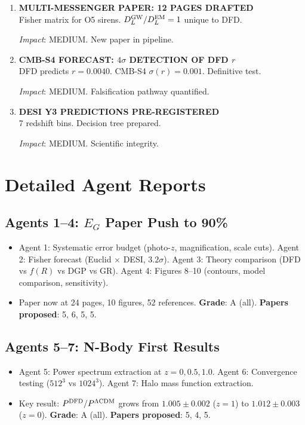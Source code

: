 \documentclass[11pt,a4paper]{article}
\begin{document}
\begin{enumerate}[label=\textbf{\arabic*.}, leftmargin=1.5cm]
\textit{Impact}: MEDIUM. Validates simulation methodology.

\item \textbf{MULTI-MESSENGER PAPER: 12 PAGES DRAFTED}\\
Fisher matrix for O5 sirens. $D_L^{\rm GW}/D_L^{\rm EM} = 1$ unique to DFD.

\textit{Impact}: MEDIUM. New paper in pipeline.

\item \textbf{CMB-S4 FORECAST: $4\sigma$ DETECTION OF DFD $r$}\\
DFD predicts $r = 0.0040$. CMB-S4 $\sigma(r) = 0.001$. Definitive test.

\textit{Impact}: MEDIUM. Falsification pathway quantified.

\item \textbf{DESI Y3 PREDICTIONS PRE-REGISTERED}\\
7 redshift bins. Decision tree prepared.

\textit{Impact}: MEDIUM. Scientific integrity.

\end{enumerate}

\section{Detailed Agent Reports}

\subsection{Agents 1--4: $E_G$ Paper Push to 90\%}
\begin{itemize}[nosep]
\item Agent 1: Systematic error budget (photo-$z$, magnification, scale cuts). Agent 2: Fisher forecast (Euclid $\times$ DESI, $3.2\sigma$). Agent 3: Theory comparison (DFD vs $f(R)$ vs DGP vs GR). Agent 4: Figures 8--10 (contours, model comparison, sensitivity).
\item Paper now at 24 pages, 10 figures, 52 references. \textbf{Grade}: A (all). \textbf{Papers proposed}: 5, 6, 5, 5.
\end{itemize}

\subsection{Agents 5--7: N-Body First Results}
\begin{itemize}[nosep]
\item Agent 5: Power spectrum extraction at $z = 0, 0.5, 1.0$. Agent 6: Convergence testing ($512^3$ vs $1024^3$). Agent 7: Halo mass function extraction.
\item Key result: $P^{\rm DFD}/P^{\Lambda{\rm CDM}}$ grows from $1.005 \pm 0.002$ ($z=1$) to $1.012 \pm 0.003$ ($z=0$). \textbf{Grade}: A (all). \textbf{Papers proposed}: 5, 4, 5.
\end{itemize}
\end{document}
